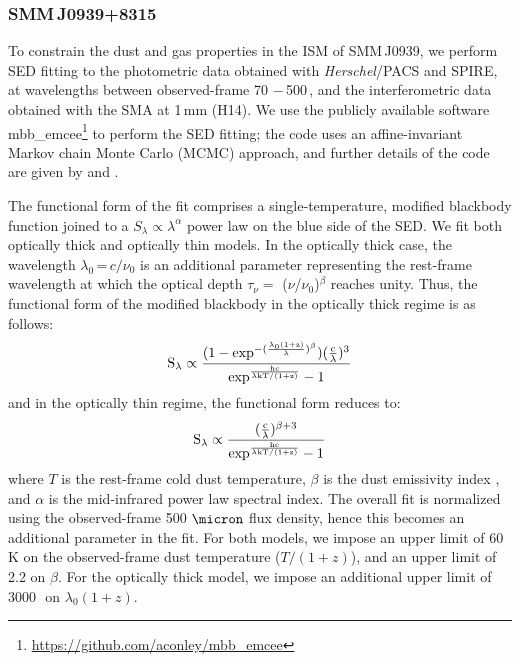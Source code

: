 \documentclass[iop, revtex4]{emulateapj}
\begin{document}
\subsubsection{SMM\,J0939+8315} \label{sec:SEDBg}
To constrain the dust and gas properties in the ISM of SMM\,J0939, we perform SED fitting to the
photometric data obtained with {\it Herschel}/PACS and SPIRE, at wavelengths
between observed-frame 70\,\micron\,$-$\,500\,\micron, and the interferometric data obtained with the SMA at 1\,mm (H14). We use the publicly
available software {\sc mbb\_emcee}\footnote{\url{https://github.com/aconley/mbb\_emcee}} to perform the SED fitting; the code uses an affine-invariant Markov chain Monte
Carlo (MCMC) approach, and further details of the code are given by \citet{Riechers13a} and \citet{Dowell14a}. \par
The
functional form of the fit comprises a single-temperature, modified blackbody function joined to a $S_{\lambda} \propto \lambda^\alpha
$ power law on the blue
side of the SED.
We fit both optically thick and optically thin models. In the optically thick case, the wavelength $
\lambda_0$\,=\,${c}/{\nu_0}$ is an additional parameter representing the rest-frame wavelength at which the optical
depth $\tau_{\nu} =$ ($\nu$/$\nu_0$)$^\beta$ reaches unity. Thus, the functional form of the modified blackbody
in the optically thick regime is as follows:
\begin{equation}
\rm S_{\lambda} \propto \frac{(1-exp^{-(\frac{\lambda_0 (1+z)}{\lambda})^{\beta}})(\frac{c}{\lambda})^3}
{exp^{\frac{hc}{\lambda\rm{kT/(1+z)} } }-1}
\end{equation}
and in the optically thin regime, the functional form reduces to:
\begin{equation}
\rm S_{\lambda} \propto \frac{(\frac{c}{\lambda})^{\beta+3}}{exp^{\frac{hc}{\lambda\rm{kT/(1+z)}}}-1}
\end{equation}
where $T$ is the rest-frame cold dust temperature, $\beta$ is the dust emissivity index 
, and $\alpha$ is the mid-infrared power law spectral index. The overall fit is normalized using the observed-frame 500
$\micron$ flux density, hence this becomes an additional parameter in the fit. For both models, we impose an upper limit of 60 K on the observed-frame dust temperature ($T/(1+z)$), and an upper limit of 2.2 on
$\beta$. For the optically thick model, we impose an additional upper limit of 3000\,\micron\ on $\lambda_0 (1+z)$.
\end{document}
